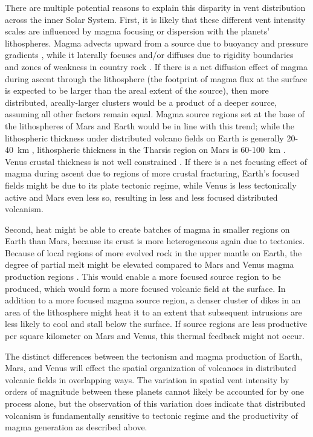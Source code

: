 There are multiple potential reasons to explain this disparity in vent distribution across the inner Solar System. First, it is likely that these different vent intensity scales are influenced by magma focusing or dispersion with the planets' lithospheres. Magma advects upward from a source due to buoyancy and pressure gradients \citep{lister1991fluid}, while it laterally focuses and/or diffuses due to rigidity boundaries and zones of weakness in country rock \citep{hebert2010generation,bonafede1998porous}. If there is a net diffusion effect of magma during ascent through the lithosphere (the footprint of magma flux at the surface is expected to be larger than the areal extent of the source), then more distributed, areally-larger clusters would be a product of a deeper source, assuming all other factors remain equal. Magma source regions set at the base of the lithospheres of Mars and Earth would be in line with this trend; while the lithospheric thickness under distributed volcano fields on Earth is generally 20-40~km \citep{kiyosugi2010relationships}, lithospheric thickness in the Tharsis region on Mars is 60-100~km \citep{neumann2004crustal}. Venus crustal thickness is not well constrained \citep{anderson2006global}. If there is a net focusing effect of magma during ascent due to regions of more crustal fracturing, Earth's focused fields might be due to its plate tectonic regime, while Venus is less tectonically active and Mars even less so, resulting in less and less focused distributed volcanism.

Second, heat might be able to create batches of magma in smaller regions on Earth than Mars, because its crust is more heterogeneous again due to tectonics. Because of local regions of more evolved rock in the upper mantle on Earth, the degree of partial melt might be elevated compared to Mars and Venus magma production regions \citep{annen2006genesis}. This would enable a more focused source region to be produced, which would form a more focused volcanic field at the surface. In addition to a more focused magma source region, a denser cluster of dikes in an area of the lithosphere might heat it to an extent that subsequent intrusions are less likely to cool and stall below the surface. If source regions are less productive per square kilometer on Mars and Venus, this thermal feedback might not occur.

The distinct differences between the tectonism and magma production of Earth, Mars, and Venus will effect the spatial organization of volcanoes in distributed volcanic fields in overlapping ways. The variation in spatial vent intensity by orders of magnitude between these planets cannot likely be accounted for by one process alone, but the observation of this variation does indicate that distributed volcanism is fundamentally sensitive to tectonic regime and the productivity of magma generation as described above.

